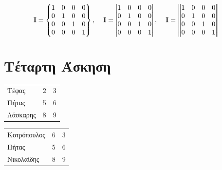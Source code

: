 \documentclass[a4paper,11pt]{article}
\begin{document}
        \vspace{5mm} 
    
         \begin{equation}
            \textbf{I}=
                \begin{Bmatrix}
                    1 & 0 & 0 & 0\\
                    0 & 1 & 0 & 0\\
                    0 & 0 & 1 & 0\\
                    0 & 0 & 0 & 1
                \end{Bmatrix}
                ,\textbf{\quad I}=
                \begin{vmatrix}
                    1 & 0 & 0 & 0\\
                    0 & 1 & 0 & 0\\
                    0 & 0 & 1 & 0\\
                    0 & 0 & 0 & 1
                \end{vmatrix}
                ,\textbf{\quad I}=
                \begin{Vmatrix}
                    1 & 0 & 0 & 0\\
                    0 & 1 & 0 & 0\\
                    0 & 0 & 1 & 0\\
                    0 & 0 & 0 & 1
                \end{Vmatrix}
        \end{equation}
    \section{Τέταρτη Άσκηση}
    
        \begin{center}
        \begin{tabular}{ l c r }
          Τέφας & 2 & 3 \\
          Πήτας & 5 & 6 \\
          Λάσκαρης & 8 & 9 \\
        \end{tabular}
        \end{center}
        
        \vspace{5mm} 
        
        \begin{center}  
        \begin{tabular}{ | l | c | r | }
          Κοτρόπουλος & 6 & 3 \\
          Πήτας & 5 & 6 \\
          Νικολαίδης & 8 & 9 \\
        \end{tabular}
        \end{center}
        
\end{document}
